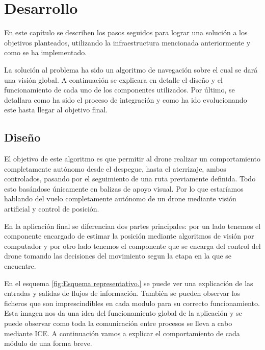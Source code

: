 \chapter{Desarrollo}\label{cap.desarrollo}
\hspace{1cm} En este capítulo se describen los pasos seguidos para lograr una solución a los objetivos planteados, utilizando la infraestructura mencionada anteriormente y como se ha implementado.

\hspace{1cm} La solución al problema ha sido un algoritmo de navegación sobre el cual se dará una visión global. A continuación se explicara en detalle el diseño y el funcionamiento de cada uno de los componentes utilizados. Por último, se detallara como ha sido el proceso de integración y como ha ido evolucionando este hasta llegar al objetivo final.


\section{Diseño}
\hspace{1cm} El objetivo de este algoritmo es que permitir al drone realizar un comportamiento completamente autónomo desde el despegue, hasta el aterrizaje, ambos controlados, pasando por el seguimiento de una ruta previamente definida. Todo esto basándose únicamente en balizas de apoyo visual. Por lo que estaríamos hablando del vuelo completamente autónomo de un drone mediante visión artificial y control de posición.

\hspace{1cm} En la aplicación final se diferencian dos partes principales: por un lado tenemos el componente encargado de estimar la posición mediante algoritmos de visión por computador y por otro lado tenemos el componente que se encarga del control del drone tomando las decisiones del movimiento segun la etapa en la que se encuentre.

\hspace{1cm} En el esquema \ref{fig:Esquema representativo.} se puede ver una explicación de las entradas y salidas de flujos de información. También se pueden observar los ficheros que son imprescindibles en cada modulo para su correcto funcionamiento. Esta imagen nos da una idea del funcionamiento global de la aplicación y se puede observar como toda la comunicación entre procesos se lleva a cabo mediante ICE. A continuación vamos a explicar el comportamiento de cada módulo de una forma breve. 

